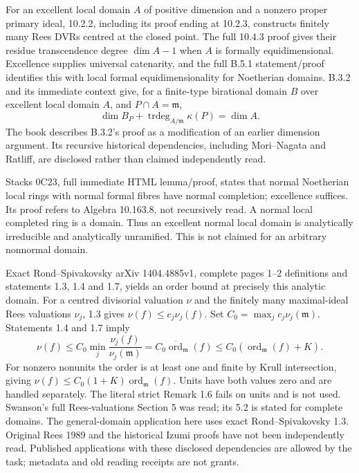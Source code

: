 \documentclass[11pt]{article}
\begin{document}
For an excellent local domain \(A\) of positive dimension and a nonzero proper primary ideal, 10.2.2, including its proof ending at 10.2.3, constructs finitely many Rees DVRs centred at the closed point. The full 10.4.3 proof gives their residue transcendence degree \(\dim A-1\) when \(A\) is formally equidimensional. Excellence supplies universal catenarity, and the full B.5.1 statement/proof identifies this with local formal equidimensionality for Noetherian domains. B.3.2 and its immediate context give, for a finite-type birational domain \(B\) over excellent local domain \(A\), and \(P\cap A=\mathfrak m\),
\[
\dim B_P+\operatorname{trdeg}_{A/\mathfrak m}\kappa(P)=\dim A.
\]
The book describes B.3.2's proof as a modification of an earlier dimension argument. Its recursive historical dependencies, including Mori--Nagata and Ratliff, are disclosed rather than claimed independently read.

Stacks 0C23, full immediate HTML lemma/proof, states that normal Noetherian local rings with normal formal fibres have normal completion; excellence suffices. Its proof refers to Algebra 10.163.8, not recursively read. A normal local completed ring is a domain. Thus an excellent normal local domain is analytically irreducible and analytically unramified. This is not claimed for an arbitrary nonnormal domain.

Exact Rond--Spivakovsky arXiv 1404.4885v1, complete pages 1--2 definitions and statements 1.3, 1.4 and 1.7, yields an order bound at precisely this analytic domain. For a centred divisorial valuation \(\nu\) and the finitely many maximal-ideal Rees valuations \(\nu_j\), 1.3 gives \(\nu(f)\le c_j\nu_j(f)\). Set \(C_0=\max_j c_j\nu_j(\mathfrak m)\). Statements 1.4 and 1.7 imply
\[
\nu(f)\le C_0\min_j\frac{\nu_j(f)}{\nu_j(\mathfrak m)}
=C_0\overline{\operatorname{ord}}_{\mathfrak m}(f)
\le C_0(\operatorname{ord}_{\mathfrak m}(f)+K).
\]
For nonzero nonunits the order is at least one and finite by Krull intersection, giving \(\nu(f)\le C_0(1+K)\operatorname{ord}_{\mathfrak m}(f)\). Units have both values zero and are handled separately. The literal strict Remark 1.6 fails on units and is not used. Swanson's full Rees-valuations Section 5 was read; its 5.2 is stated for complete domains. The general-domain application here uses exact Rond--Spivakovsky 1.3. Original Rees 1989 and the historical Izumi proofs have not been independently read. Published applications with these disclosed dependencies are allowed by the task; metadata and old reading receipts are not grants.
\end{document}
